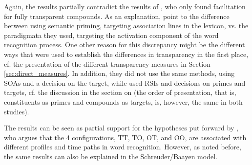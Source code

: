 Again, the results partially contradict the results of
 \citet{Sandra:1990}, who only found facilitation for fully
 transparent compounds. As an explanation, \citet[63]{Libbenetal:2003} point to the difference
 between using semantic priming, targeting association lines in the
 lexicon, vs. the paradigmata they used, targeting the activation
 component of the word recognition process.   
One other reason for this
discrepancy might be the different ways that were used to establish the
differences in transparency in the first place, cf. the presentation of the
different transparency measures in Section
\ref{sec:direct_measures}. In addition, they did not use the same
methods, \citeauthor{Libbenetal:2003} using SOAs and a decision on the target, while
\citeauthor{Sandra:1990} used RSIs and decisions on primes and targets, cf. the
discussion in the section on \citet{Zwitserlood:1994} (the order of
presentation, that is, constituents as primes and compounds as
targets, is, however, the same in both studies).

The results can be seen as partial support for the hypotheses put
forward by
\citet{Libben:1998}, who argues that the 4 configurations, TT, TO, OT, and OO, are
associated with different profiles and time paths in word
recognition. However, as noted before, the same results can also be
explained in the Schreuder/Baayen model.







